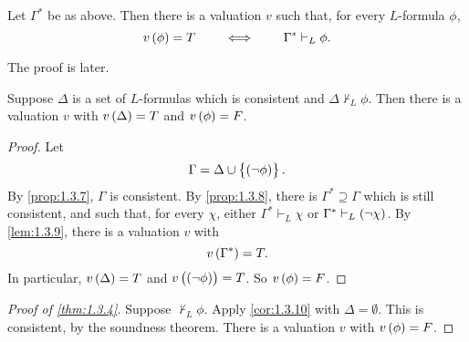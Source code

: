 \pagebreak


\begin{lemma}
\label{lem:1.3.9}
Let $ \Gamma^* $ be as above. Then there is a valuation $ v $ such that, for every $ L $-formula $ \phi $,
$$ v\br{\phi} = T \qquad \iff \qquad \Gamma^* \vdash_L \phi. $$
\end{lemma}

The proof is later.

\begin{corollary}
\label{cor:1.3.10}
Suppose $ \Delta $ is a set of $ L $-formulas which is consistent and $ \Delta \not\vdash_L \phi $. Then there is a valuation $ v $ with $ v\br{\Delta} = T $ and $ v\br{\phi} = F $.
\end{corollary}

\begin{proof}
Let
$$ \Gamma = \Delta \cup \cbr{\notb{\phi}}. $$
By \ref{prop:1.3.7}, $ \Gamma $ is consistent. By \ref{prop:1.3.8}, there is $ \Gamma^* \supseteq \Gamma $ which is still consistent, and such that, for every $ \chi $, either $ \Gamma^* \vdash_L \chi $ or $ \Gamma^* \vdash_L \notb{\chi} $. By \ref{lem:1.3.9}, there is a valuation $ v $ with
$$ v\br{\Gamma^*} = T. $$
In particular, $ v\br{\Delta} = T $ and $ v\br{\notb{\phi}} = T $. So $ v\br{\phi} = F $.
\end{proof}

\begin{proof}[Proof of \ref{thm:1.3.4}]
Suppose $ \not\vdash_L \phi $. Apply \ref{cor:1.3.10} with $ \Delta = \emptyset $. This is consistent, by the soundness theorem. There is a valuation $ v $ with $ v\br{\phi} = F $.
\end{proof}

